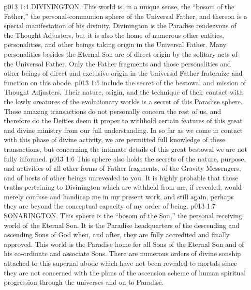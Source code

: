 \vs p013 1:4 \bibnobreakspace DIVININGTON. This world is, in a unique sense, the “bosom of the Father,” the personal\hyp{}communion sphere of the Universal Father, and thereon is a special manifestation of his divinity. Divinington is the Paradise rendezvous of the Thought Adjusters, but it is also the home of numerous other entities, personalities, and other beings taking origin in the Universal Father. Many personalities besides the Eternal Son are of direct origin by the solitary acts of the Universal Father. Only the Father fragments and those personalities and other beings of direct and exclusive origin in the Universal Father fraternize and function on this abode.
\vs p013 1:5 \pc {} include the secret of the bestowal and mission of Thought Adjusters. Their nature, origin, and the technique of their contact with the lowly creatures of the evolutionary worlds is a secret of this Paradise sphere. These amazing transactions do not personally concern the rest of us, and therefore do the Deities deem it proper to withhold certain features of this great and divine ministry from our full understanding. In so far as we come in contact with this phase of divine activity, we are permitted full knowledge of these transactions, but concerning the intimate details of this great bestowal we are not fully informed.
\vs p013 1:6 This sphere also holds the secrets of the nature, purpose, and activities of all other forms of Father fragments, of the Gravity Messengers, and of hosts of other beings unrevealed to you. It is highly probable that those truths pertaining to Divinington which are withheld from me, if revealed, would merely confuse and handicap me in my present work, and still again, perhaps they are beyond the conceptual capacity of my order of being.
\vs p013 1:7 \bibnobreakspace SONARINGTON. This sphere is the “bosom of the Son,” the personal receiving world of the Eternal Son. It is the Paradise headquarters of the descending and ascending Sons of God when, and after, they are fully accredited and finally approved. This world is the Paradise home for all Sons of the Eternal Son and of his co\hyp{}ordinate and associate Sons. There are numerous orders of divine sonship attached to this supernal abode which have not been revealed to mortals since they are not concerned with the plans of the ascension scheme of human spiritual progression through the universes and on to Paradise.
